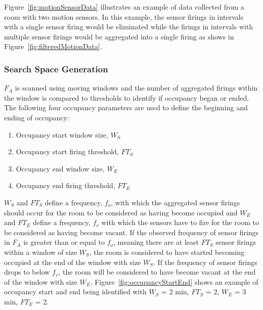 Figure~\ref{fig:motionSensorData} illustrates an example of data collected from
a room with two motion sensors. In this example, the sensor firings in intervals
with a single sensor firing would be eliminated while the firings in intervals
with multiple sensor firings would be aggregated into a single firing as shows
in Figure~\ref{fig:filteredMotionData}.

\begin{figure}[!htb]
\end{figure}

\subsubsection{Search Space Generation}

$F_A$ is scanned using moving windows and the number of aggregated firings
within the window is compared to thresholds to identify if occupancy began or
ended. The following four occupancy parameters are used to define the
beginning and ending of occupancy:
\begin{enumerate}
\item Occupancy start window size, $W_S$
\item Occupancy start firing threshold, $FT_S$
\item Occupancy end window size, $W_E$
\item Occupancy end firing threshold, $FT_E$
\end{enumerate}

$W_S$ and $FT_S$ define a frequency, $f_o$, with which the aggregated sensor
firings should occur for the room to be considered as having become occupied and
$W_E$ and $FT_E$ define a frequency, $f_v$ with which the sensors have to fire
for the room to be considered as having become vacant. If the observed frequency
of sensor firings in $F_A$ is greater than or equal to $f_o$, meaning there are
at least $FT_S$ sensor firings within a window of size $W_S$, the room is
considered to have started becoming occupied at the end of the window with
size $W_S$. If the frequency of sensor firings drops to below $f_v$, the
room will be considered to have become vacant at the end of the window with
size $W_E$. Figure~\ref{fig:occupancyStartEnd} shows an example of occupancy
start and end being identified with $W_S$ = 2 min, $FT_S$ = 2, $W_E$ = 3 min,
$FT_E$ = 2.  

